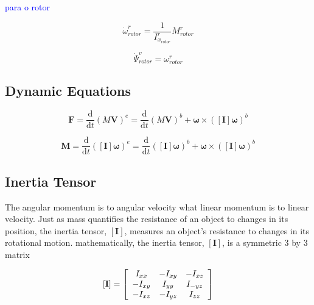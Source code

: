 \textcolor{blue}{para o rotor}

\begin{equation}
    \dot{\omega}^r_{rotor} = \frac{1}{I^r_{x_{rotor}}} M^r_{rotor}
\end{equation}

\begin{equation}
    \dot{\Psi}^v_{rotor} = \omega^r_{rotor} 
\end{equation}



\subsection{Dynamic Equations}

\begin{equation}
    \boldsymbol{F} = \frac{\mathrm{d}}{\mathrm{d}t} \left( M \boldsymbol{V} \right)^e = \frac{\mathrm{d}}{\mathrm{d}t} \left( M \boldsymbol{V} \right)^b + \boldsymbol{\omega} \times \left( \left[\boldsymbol{I}\right] \boldsymbol{\omega} \right)^b
\end{equation}


\begin{equation}
    \boldsymbol{M} = \frac{\mathrm{d}}{\mathrm{d}t} \left( \left[\boldsymbol{I}\right] \boldsymbol{\omega} \right)^e = \frac{\mathrm{d}}{\mathrm{d}t} \left( \left[\boldsymbol{I}\right] \boldsymbol{\omega} \right)^b + \boldsymbol{\omega} \times \left( \left[\boldsymbol{I}\right] \boldsymbol{\omega} \right)^b 
\end{equation}

\subsection{Inertia Tensor}

The angular momentum is to angular velocity what linear momentum is to linear velocity. Just as mass quantifies the resistance of an object to changes in its position, the inertia tensor, $\left[\mathbf{I}\right]$, measures an object's resistance to changes in its rotational motion. mathematically, the inertia tensor, $\left[\mathbf{I}\right]$, is a symmetric 3 by 3 matrix 

\begin{equation}
    \left[\mathbf{I}\right]=\left[\begin{array}{c c c}{{I_{x x}}}&{{-I_{x y}}}&{{-I_{x z}}}\\ {{-I_{x y}}}&{{I_{y y}}}&{{I_{-y z}}}\\ {{-I_{x z}}}&{{-I_{y z}}}&{{I_{z z}}}\end{array}\right]
\end{equation}

